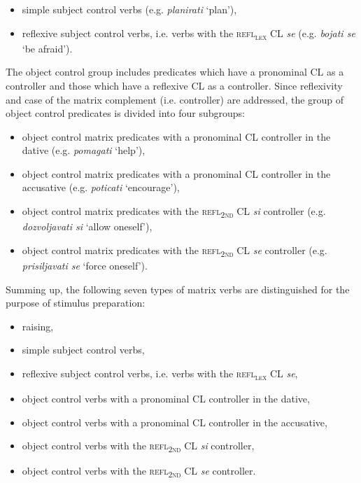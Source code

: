 \begin{itemize}
\item simple subject control verbs (e.g. \textit{planirati} ‘plan’),
\item reflexive subject control verbs, i.e. verbs with the \textsc{refl\textsubscript{\textsc{lex}}} CL \textit{se} (e.g. \textit{bojati se} ‘be afraid’).
\end{itemize}

The object control group includes predicates which have a pronominal CL as a controller and those which have a reflexive CL as a controller. Since reflexivity and case of the matrix complement (i.e. controller) are addressed, the group of object control predicates is divided into four subgroups: 

\begin{itemize}
\item object control matrix predicates with a pronominal CL controller in the dative (e.g. \textit{pomagati} ‘help’),
\item object control matrix predicates with a pronominal CL controller in the accusative (e.g. \textit{poticati} ‘encourage’),
\item object control matrix predicates with the \textsc{refl\textsubscript{2nd}} CL \textit{si} controller (e.g. \textit{dozvoljavati si} ‘allow oneself’),
\item object control matrix predicates with the \textsc{refl\textsubscript{2nd}} CL \textit{se} controller (e.g. \textit{prisiljavati se} ‘force oneself’).
\end{itemize}

Summing up, the following seven types of matrix verbs are distinguished for the purpose of stimulus preparation: 

\begin{itemize}
\item raising,
\item simple subject control verbs,
\item reflexive subject control verbs, i.e. verbs with the \textsc{refl\textsubscript{\textsc{lex}}} CL \textit{se},
\item object control verbs with a pronominal CL controller in the dative,
\item object control verbs with a pronominal CL controller in the accusative,
\item object control verbs with the \textsc{refl\textsubscript{2nd}} CL \textit{si} controller,
\item object control verbs with the \textsc{refl\textsubscript{2nd}} CL \textit{se} controller. 
\end{itemize}

